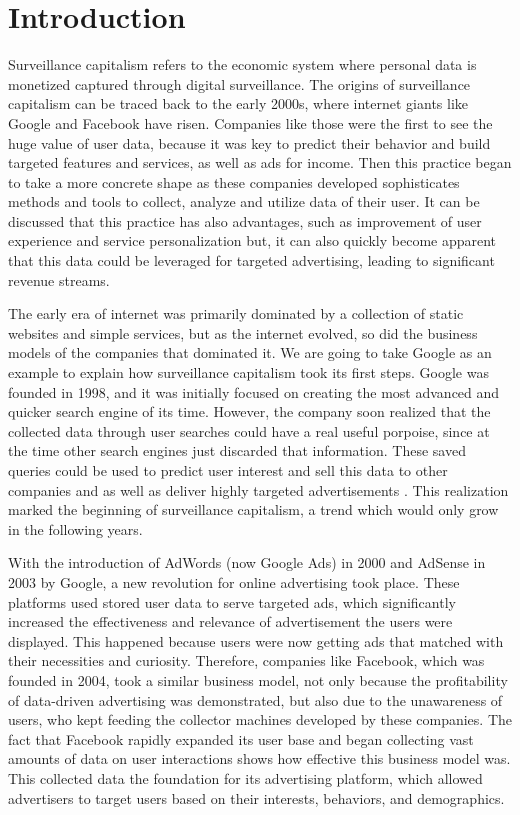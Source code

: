 \section{Introduction}\label{sec:introduction}
Surveillance capitalism refers to the economic system where personal data is monetized captured through digital surveillance.
The origins of surveillance capitalism can be traced back to the early 2000s, where internet giants like Google and Facebook have risen.
Companies like those were the first to see the huge value of user data, because it was key to predict their behavior and build targeted features and services, as well as ads for income.
Then this practice began to take a more concrete shape as these companies developed sophisticates methods and tools to collect, analyze and utilize data of their user.
It can be discussed that this practice has also advantages, such as improvement of user experience and service personalization but, it can also quickly become apparent that this data could be leveraged for targeted advertising, leading to significant revenue streams.

The early era of internet was primarily dominated by a collection of static websites and simple services, but as the internet evolved, so did the business models of the companies that dominated it.
We are going to take Google as an example to explain how surveillance capitalism took its first steps.
Google was founded in 1998, and it was initially focused on creating the most advanced and quicker search engine of its time.
However, the company soon realized that the collected data through user searches could have a real useful porpoise, since at the time other search engines just discarded that information.
These saved queries could be used to predict user interest and sell this data to other companies and as well as deliver highly targeted advertisements .
This realization marked the beginning of surveillance capitalism, a trend which would only grow in the following years.

With the introduction of AdWords (now Google Ads) in 2000 and AdSense in 2003 by Google, a new revolution for online advertising took place.
These platforms used stored user data to serve targeted ads, which significantly increased the effectiveness and relevance of advertisement the users were displayed.
This happened because users were now getting ads that matched with their necessities and curiosity.
Therefore, companies like Facebook, which was founded in 2004, took a similar business model, not only because the profitability of data-driven advertising was demonstrated, but also due to the unawareness of users, who kept feeding the collector machines developed by these companies.
The fact that Facebook rapidly expanded its user base and began collecting vast amounts of data on user interactions shows how effective this business model was.
This collected data the foundation for its advertising platform, which allowed advertisers to target users based on their interests, behaviors, and demographics.

